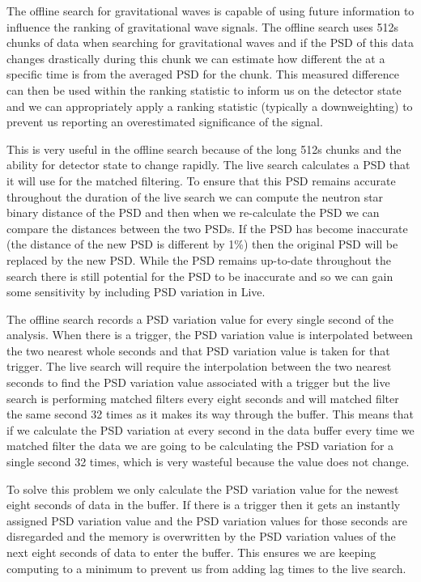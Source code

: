 The offline search for gravitational waves is capable of using future information to influence the ranking of gravitational wave signals. The offline search uses 512s chunks of data when searching for gravitational waves and if the PSD of this data changes drastically during this chunk we can estimate how different the at a specific time is from the averaged PSD for the chunk. This measured difference can then be used within the ranking statistic to inform us on the detector state and we can appropriately apply a ranking statistic (typically a downweighting) to prevent us reporting an overestimated significance of the signal.

This is very useful in the offline search because of the long 512s chunks and the ability for detector state to change rapidly. The live search calculates a PSD that it will use for the matched filtering. To ensure that this PSD remains accurate throughout the duration of the live search we can compute the neutron star binary distance of the PSD and then when we re-calculate the PSD we can compare the distances between the two PSDs. If the PSD has become inaccurate (the distance of the new PSD is different by 1\%) then the original PSD will be replaced by the new PSD. While the PSD remains up-to-date throughout the search there is still potential for the PSD to be inaccurate and so we can gain some sensitivity by including PSD variation in Live.

The offline search records a PSD variation value for every single second of the analysis. When there is a trigger, the PSD variation value is interpolated between the two nearest whole seconds and that PSD variation value is taken for that trigger. The live search will require the interpolation between the two nearest seconds to find the PSD variation value associated with a trigger but the live search is performing matched filters every eight seconds and will matched filter the same second 32 times as it makes its way through the buffer. This means that if we calculate the PSD variation at every second in the data buffer every time we matched filter the data we are going to be calculating the PSD variation for a single second 32 times, which is very wasteful because the value does not change.

To solve this problem we only calculate the PSD variation value for the newest eight seconds of data in the buffer. If there is a trigger then it gets an instantly assigned PSD variation value and the PSD variation values for those seconds are disregarded and the memory is overwritten by the PSD variation values of the next eight seconds of data to enter the buffer. This ensures we are keeping computing to a minimum to prevent us from adding lag times to the live search.

